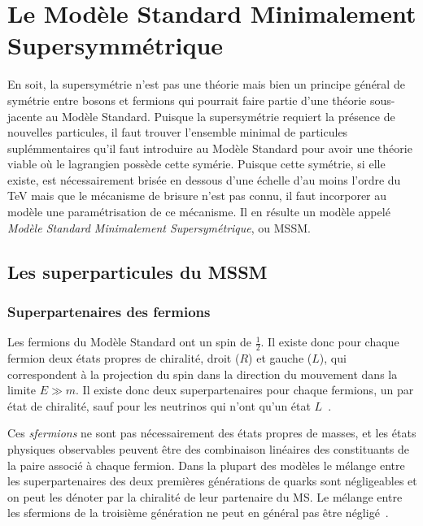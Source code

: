 \section{Le Modèle Standard Minimalement Supersymmétrique}
\label{sec:susy:mssm}

En soit, la supersymétrie n'est pas une théorie mais bien un principe
général de symétrie entre bosons et fermions qui pourrait faire partie
d'une théorie sous-jacente au Modèle Standard. Puisque la
supersymétrie requiert la présence de nouvelles particules, il faut
trouver l'ensemble minimal de particules suplémmentaires qu'il faut
introduire au Modèle Standard pour avoir une théorie viable où le
lagrangien possède cette symérie. Puisque cette symétrie, si elle
existe, est nécessairement brisée en dessous d'une échelle d'au moins
l'ordre du TeV mais que le mécanisme de brisure n'est pas connu, il
faut incorporer au modèle une paramétrisation de ce mécanisme. Il en
résulte un modèle appelé \emph{Modèle Standard Minimalement
  Supersymétrique}, ou MSSM. 

\subsection{Les superparticules du MSSM}
\label{sec:susy:mssm:sparticules}

\subsubsection{Superpartenaires des fermions}

Les fermions du Modèle Standard ont un spin de $\frac{1}{2}$. Il
existe donc pour chaque fermion deux états propres de chiralité, droit
($R$) et gauche ($L$), qui correspondent à la projection du spin dans
la direction du mouvement dans la limite $E \gg m$. Il existe donc
deux superpartenaires pour chaque fermions, un par état de chiralité,
sauf pour les neutrinos qui n'ont qu'un état $L$~\cite{thomson_modern_2013}.

Ces \emph{sfermions} ne sont pas nécessairement des états propres de
masses, et les états physiques observables peuvent être des
combinaison linéaires des constituants de la paire associé à chaque
fermion. Dans la plupart des modèles le mélange entre les
superpartenaires des deux premières générations de quarks sont
négligeables et on peut les dénoter par la chiralité de leur
partenaire du MS. Le mélange entre les sfermions de la troisième
génération ne peut en général pas être
négligé~\cite{aad_summary_2015}.

